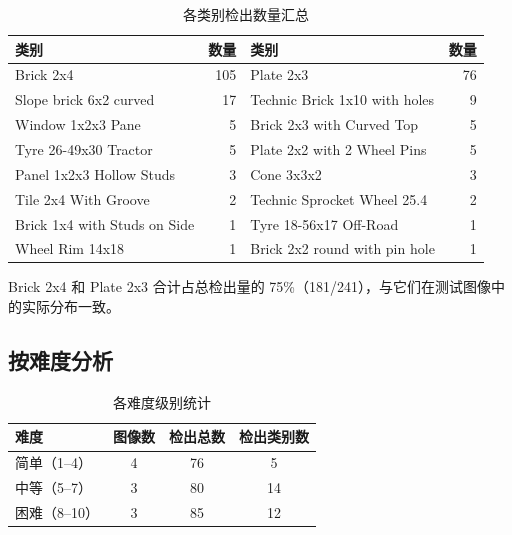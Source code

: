 \documentclass[12pt,a4paper]{ctexart}
\begin{document}
\begin{table}[H]
    \centering
    \caption{各类别检出数量汇总}
    \label{tab:classes}
    \begin{tabular}{lrlr}
        \toprule
        \textbf{类别} & \textbf{数量} & \textbf{类别} & \textbf{数量} \\
        \midrule
        Brick 2x4                    & 105 & Plate 2x3                      & 76 \\
        Slope brick 6x2 curved       & 17  & Technic Brick 1x10 with holes   & 9  \\
        Window 1x2x3 Pane            & 5   & Brick 2x3 with Curved Top       & 5  \\
        Tyre 26-49x30 Tractor        & 5   & Plate 2x2 with 2 Wheel Pins     & 5  \\
        Panel 1x2x3 Hollow Studs     & 3   & Cone 3x3x2                      & 3  \\
        Tile 2x4 With Groove         & 2   & Technic Sprocket Wheel 25.4     & 2  \\
        Brick 1x4 with Studs on Side & 1   & Tyre 18-56x17 Off-Road          & 1  \\
        Wheel Rim 14x18              & 1   & Brick 2x2 round with pin hole   & 1  \\
        \bottomrule
    \end{tabular}
\end{table}

Brick 2x4 和 Plate 2x3 合计占总检出量的 75\%（181/241），与它们在测试图像中的实际分布一致。

\subsection{按难度分析}

\begin{table}[H]
    \centering
    \caption{各难度级别统计}
    \label{tab:difficulty}
    \begin{tabular}{lccc}
        \toprule
        \textbf{难度} & \textbf{图像数} & \textbf{检出总数} & \textbf{检出类别数} \\
        \midrule
        简单（1--4）  & 4  & 76  & 5  \\
        中等（5--7）  & 3  & 80  & 14 \\
        困难（8--10） & 3  & 85  & 12 \\
        \bottomrule
    \end{tabular}
\end{table}
\end{document}
